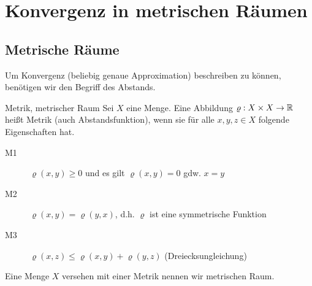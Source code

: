 \chapter{Konvergenz in metrischen Räumen}
\section{Metrische Räume}
Um Konvergenz (beliebig genaue Approximation) beschreiben zu können, benötigen wir den Begriff des Abstands.
\begin{definition}{Metrik, metrischer Raum}
	Sei $X$ eine Menge. Eine Abbildung $\varrho:X\times X\rightarrow \mathbb{R}$ heißt Metrik (auch Abstandsfunktion), wenn sie für alle $x,y,z\in X$ folgende Eigenschaften hat.
	\begin{description}
		\item[M1] $\varrho(x,y)\geq 0$ und es gilt $\varrho(x,y)=0$ gdw. $x=y$
		\item[M2] $\varrho(x,y)=\varrho(y,x)$, d.h. $\varrho$ ist eine symmetrische Funktion
		\item[M3] $\varrho(x,z)\leq\varrho(x,y)+\varrho(y,z)$ (Dreiecksungleichung)
	\end{description}
	Eine Menge $X$ versehen mit einer Metrik nennen wir metrischen Raum.
\end{definition}


